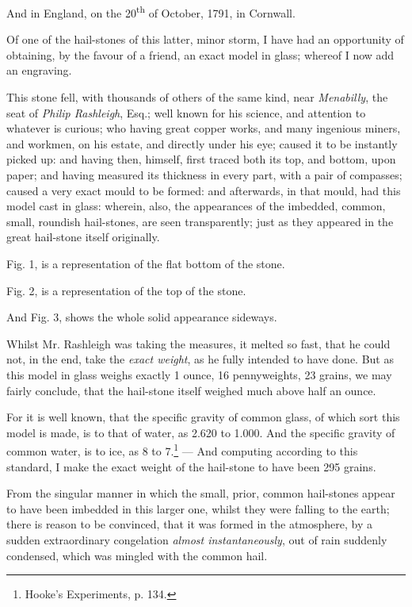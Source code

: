 \documentclass[a4paper, 12pt, oneside]{article}
\begin{document}
And in England, on the 20\textsuperscript{th} of October, 1791, in Cornwall.

Of one of the hail-stones of this latter, minor storm, I have had an opportunity of obtaining, by the favour of a friend, an exact model in glass; whereof I now add an engraving.

This stone fell, with thousands of others of the same kind, near \emph{Menabilly}, the seat of \emph{Philip Rashleigh}, Esq.; well known for his science, and attention to whatever is curious; who having great copper works, and many ingenious miners, and workmen, on his estate, and directly under his eye; caused it to be instantly picked up: and having then, himself, first traced both its top, and bottom, upon paper; and having measured its thickness in every part, with a pair of compasses; caused a very exact mould to be formed: and afterwards, in that mould, had this model cast in glass: wherein, also, the appearances of the imbedded, common, small, roundish hail-stones, are seen transparently; just as they appeared in the great hail-stone itself originally.

Fig. 1, is a representation of the flat bottom of the stone.

Fig. 2, is a representation of the top of the stone.

And Fig. 3, shows the whole solid appearance sideways.

Whilst Mr. Rashleigh was taking the measures, it melted so fast, that he could not, in the end, take the \emph{exact weight}, as he fully intended to have done. But as this model in glass weighs exactly 1 ounce, 16 pennyweights, 23 grains, we may fairly conclude, that the hail-stone itself weighed much above half an ounce.

For it is well known, that the specific gravity of common glass, of which sort this model is made, is to that of water, as 2.620 to 1.000. And the specific gravity of common water, is to ice, as 8 to 7.\footnote{Hooke's Experiments, p. 134.} --- And computing according to this standard, I make the exact weight of the hail-stone to have been 295 grains.

From the singular manner in which the small, prior, common hail-stones appear to have been imbedded in this larger one, whilst they were falling to the earth; there is reason to be convinced, that it was formed in the atmosphere, by a sudden extraordinary congelation \emph{almost instantaneously}, out of rain suddenly condensed, which was mingled with the common hail.
\end{document}
